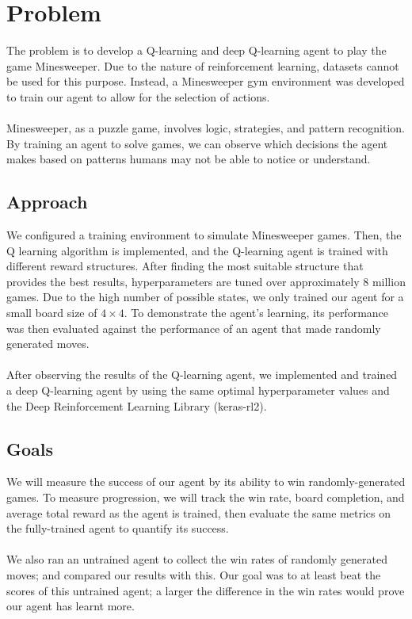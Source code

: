 \section{Problem}

The problem is to develop a Q-learning and deep Q-learning agent to play the game  Minesweeper. Due to the nature of reinforcement learning, datasets cannot be used for this purpose. Instead, a Minesweeper gym environment was developed to train our agent to allow for the selection of actions.
\\\\
Minesweeper, as a puzzle game, involves logic, strategies, and pattern recognition. By training an agent to solve games, we can observe which decisions the agent makes based on patterns humans may not be able to notice or understand. 

\subsection{Approach}

We configured a training environment to simulate Minesweeper games. Then, the Q learning algorithm is implemented, and the Q-learning agent is trained with different reward structures. After finding the most suitable structure that provides the best results, hyperparameters are tuned over approximately 8 million games. Due to the high number of possible states, we only trained our agent for a small board size of $4\times4$. To demonstrate the agent’s learning, its performance was then evaluated against the performance of an agent that made randomly generated moves.
\\\\
After observing the results of the Q-learning agent, we implemented and trained a deep Q-learning agent by using the same optimal hyperparameter values and the Deep Reinforcement Learning Library (keras-rl2).

\subsection{Goals}

We will measure the success of our agent by its ability to win randomly-generated games.
To measure progression, we will track the win rate, board completion, and average total reward as the agent is trained, then evaluate the same metrics on the fully-trained agent to quantify its success.
\\\\
We also ran an untrained agent to collect the win rates of randomly generated moves; and compared our results with this. Our goal was to at least beat the scores of this untrained agent; a larger the difference in the win rates would prove our agent has learnt more.
